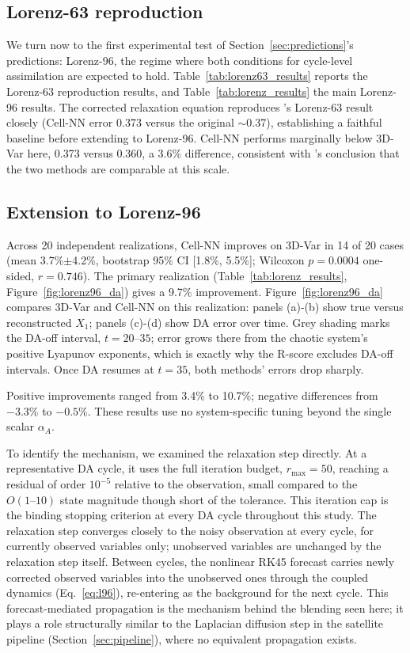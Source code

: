 \documentclass[final,5p,times,twocolumn,authoryear]{elsarticle}
\begin{document}
\subsection{Lorenz-63 reproduction}
\label{sec:lorenz63}

We turn now to the first experimental test of
Section~\ref{sec:predictions}'s predictions: Lorenz-96, the regime
where both conditions for cycle-level assimilation are expected to
hold. Table~\ref{tab:lorenz63_results} reports the Lorenz-63
reproduction results, and Table~\ref{tab:lorenz_results} the main
Lorenz-96 results. The corrected relaxation equation reproduces
\citet{magno2025}'s Lorenz-63 result closely (Cell-NN error 0.373
versus the original $\sim$0.37), establishing a faithful baseline
before extending to Lorenz-96. Cell-NN performs marginally below
3D-Var here, 0.373 versus 0.360, a 3.6\% difference, consistent with
\citet{magno2025}'s conclusion that the two methods are comparable at
this scale.

\subsection{Extension to Lorenz-96}

Across 20 independent realizations, Cell-NN improves on 3D-Var in 14
of 20 cases (mean 3.7\%$\pm$4.2\%, bootstrap 95\% CI [1.8\%, 5.5\%];
Wilcoxon $p=0.0004$ one-sided, $r=0.746$). The primary realization
(Table~\ref{tab:lorenz_results}, Figure~\ref{fig:lorenz96_da}) gives
a 9.7\% improvement. Figure~\ref{fig:lorenz96_da} compares 3D-Var and
Cell-NN on this realization: panels (a)-(b) show true versus
reconstructed $X_1$; panels (c)-(d) show DA error over time. Grey
shading marks the DA-off interval, $t=20$--$35$; error grows there
from the chaotic system's positive Lyapunov exponents, which is
exactly why the R-score excludes DA-off intervals. Once DA resumes
at $t=35$, both methods' errors drop sharply.

Positive improvements ranged from 3.4\% to 10.7\%; negative
differences from $-3.3\%$ to $-0.5\%$. These results use no
system-specific tuning beyond the single scalar $\alpha_A$.

To identify the mechanism, we examined the relaxation step directly.
At a representative DA cycle, it uses the full iteration budget,
$r_\text{max}=50$, reaching a residual of order $10^{-5}$ relative
to the observation, small compared to the $O(1\text{--}10)$ state
magnitude though short of the tolerance. This iteration cap is the
binding stopping criterion at every DA cycle throughout this study.
The relaxation step converges closely to the noisy observation at
every cycle, for currently observed variables only; unobserved
variables are unchanged by the relaxation step itself. Between
cycles, the nonlinear RK45 forecast carries newly corrected observed
variables into the unobserved ones through the coupled dynamics
(Eq.~\eqref{eq:l96}), re-entering as the background for the next
cycle. This forecast-mediated propagation is the mechanism behind
the blending seen here; it plays a role structurally similar to the
Laplacian diffusion step in the satellite pipeline
(Section~\ref{sec:pipeline}), where no equivalent propagation exists.
\end{document}

